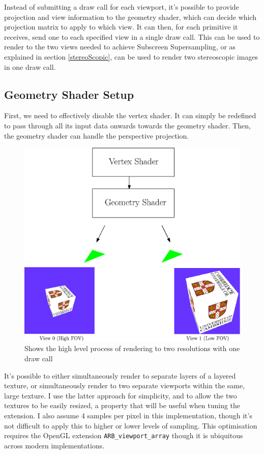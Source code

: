 \documentclass[12pt,a4paper,twoside,openright]{report}
\begin{document}
Instead of submitting a draw call for each viewport, it's possible to provide projection and view information to the geometry shader, which can decide which projection matrix to apply to which view. It can then, for each primitive it receives, send one to each specified view in a single draw call. This can be used to render to the two views needed to achieve Subscreen Supersampling, or as explained in section \ref{stereoScopic}, can be used to render two stereoscopic images in one draw call.

\subsection{Geometry Shader Setup}

First, we need to effectively disable the vertex shader. It can simply be redefined to pass through all its input data onwards towards the geometry shader.
Then, the geometry shader can handle the perspective projection.

\begin{figure}[tbh]
\centerline{\includegraphics[scale=0.6]{figs/geoshader.eps}}
\caption{Shows the high level process of rendering to two resolutions with one draw call}
\label{epsfig1}
\end{figure}

\noindent It's possible to either simultaneously render to separate layers of a layered texture, or simultaneously render to two separate viewports within the same, large texture. I use the latter approach for simplicity, and to allow the two textures to be easily resized, a property that will be useful when tuning the extension. I also assume 4 samples per pixel in this implementation, though it's not difficult to apply this to higher or lower levels of sampling. This optimisation requires the OpenGL extension \texttt{ARB\_viewport\_array} \cite{arbViewport} though it is ubiquitous across modern implementations.
\end{document}
